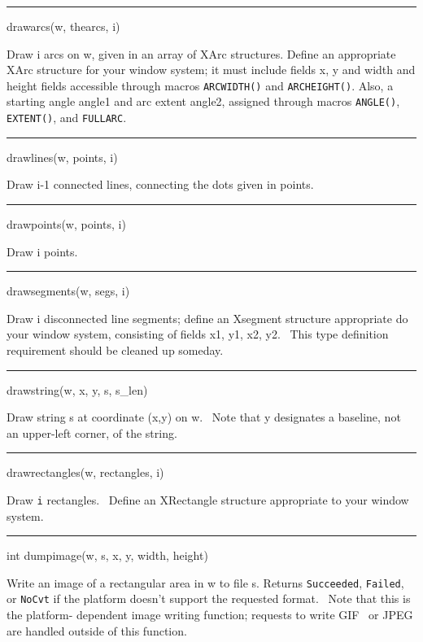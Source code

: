 {\sffamily\bfseries
\bigskip\hrule\vspace{0.1cm}
\noindent
drawarcs(w, thearcs, i)}


Draw i arcs on w, given in an array of XArc structures. Define an
appropriate XArc structure for your window system; it must include
fields x, y and width and height fields accessible through macros
\texttt{ARCWIDTH()} and \texttt{ARCHEIGHT()}. Also, a starting angle
angle1 and arc extent angle2, assigned through macros
\texttt{ANGLE()}, \texttt{EXTENT()}, and \texttt{FULLARC}.


\bigskip\hrule\vspace{0.1cm}
\noindent
drawlines(w, points, i)


Draw i-1 connected lines, connecting the dots given in points.


\bigskip\hrule\vspace{0.1cm}
\noindent
drawpoints(w, points, i)


Draw i points.


\bigskip\hrule\vspace{0.1cm}
\noindent
drawsegments(w, segs, i)


Draw i disconnected line segments; define an Xsegment structure appropriate do your window system, consisting of fields
x1, y1, x2, y2. \ This type definition requirement should be cleaned up someday.


\bigskip\hrule\vspace{0.1cm}
\noindent
drawstring(w, x, y, s, s\_len)


Draw string s at coordinate (x,y) on w. \ Note that y designates a baseline, not an upper-left corner, of the string.


\bigskip\hrule\vspace{0.1cm}
\noindent
drawrectangles(w, rectangles, i)


Draw \texttt{i} rectangles. \ Define an XRectangle structure appropriate to your window system.

\bigskip\hrule\vspace{0.1cm}
\noindent



int dumpimage(w, s, x, y, width, height)


Write an image of a rectangular area in w to file s. Returns \texttt{Succeeded}, \texttt{Failed}, or \texttt{NoCvt} if
the platform doesn't support the requested format. \ Note that this is the {\textquotedbl}platform- dependent image
writing function{\textquotedbl}; requests to write GIF \ or JPEG are handled outside of this function.



